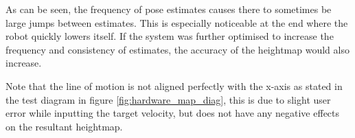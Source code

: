         \noindent
        As can be seen, the frequency of pose estimates causes there to sometimes be large jumps between estimates. This is especially noticeable at the end where the robot quickly lowers itself. If the system was further optimised to increase the frequency and consistency of estimates, the accuracy of the heightmap would also increase.

        Note that the line of motion is not aligned perfectly with the x-axis as stated in the test diagram in figure \ref{fig:hardware_map_diag}, this is due to slight user
        error while inputting the target velocity, but does not have any negative effects on the resultant heightmap.
